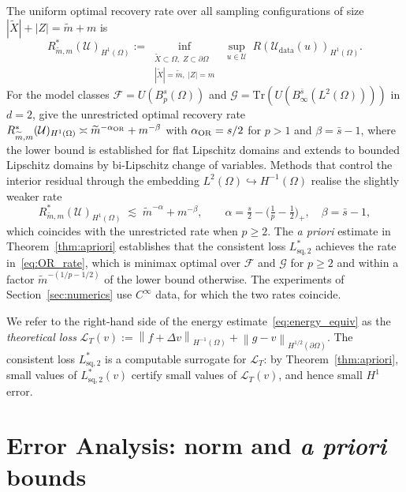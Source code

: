 \documentclass[11pt]{article}
\newcommand{\Omg}{\Omega}
\newcommand{\bOmg}{\partial\Omega}
\newcommand{\norm}[1]{\left\|#1\right\|}
\newcommand{\mtil}{\widetilde{m}}
\begin{document}
The uniform optimal recovery rate over all sampling
configurations of size $|\tilde{X}| + |Z| = \mtil + m$ is
\[
  R^*_{\mtil,m}(\mathcal{U})_{H^1(\Omg)}
  := \inf_{\substack{\tilde{X}\subset\Omg,\;
     Z\subset\bOmg \\ |\tilde{X}|=\mtil,\;|Z|=m}}
     \;\sup_{u\in\mathcal{U}}\;
     R(\mathcal{U}_{\mathrm{data}}(u))_{H^1(\Omg)}.
\]
For the model classes $\mathcal{F}=U(B^s_p(\Omg))$ and
$\mathcal{G}=\mathrm{Tr}(U(B^{\bar{s}}_\infty(L^2(\Omg))))$ in $d=2$,
\cite[Theorems~3.1 and~3.2]{bonito2025} give the unrestricted
optimal recovery rate
$R^*_{\mtil,m}(\mathcal{U})_{H^1(\Omg)}\asymp\mtil^{-\alpha_{\rm OR}}
+m^{-\beta}$ with $\alpha_{\rm OR}=s/2$ for $p>1$ and
$\beta=\bar{s}-1$, where the lower bound is established for flat
Lipschitz domains and extends to bounded Lipschitz domains by
bi-Lipschitz change of variables. Methods that control the interior
residual through the embedding $L^2(\Omg)\hookrightarrow
H^{-1}(\Omg)$ realise the slightly weaker rate
\begin{equation}\label{eq:OR_rate}
  R^*_{\mtil,m}(\mathcal{U})_{H^1(\Omg)}
  \;\lesssim\; \mtil^{-\alpha} + m^{-\beta},
  \qquad
  \alpha = \tfrac{s}{2}
    - \bigl(\tfrac{1}{p}-\tfrac{1}{2}\bigr)_+,
  \quad
  \beta = \bar{s} - 1,
\end{equation}
which coincides with the unrestricted rate when $p\ge 2$. The
\emph{a priori} estimate in Theorem~\ref{thm:apriori} establishes
that the consistent loss $L^*_{\mathrm{sq},2}$ achieves the rate
in~\eqref{eq:OR_rate}, which is minimax optimal over
$\mathcal{F}$ and $\mathcal{G}$ for $p\ge 2$ and within a factor
$\mtil^{-(1/p-1/2)}$ of the lower bound otherwise. The experiments
of Section~\ref{sec:numerics} use $C^\infty$ data, for which the
two rates coincide.
 
We refer to the right-hand side of the energy
estimate~\eqref{eq:energy_equiv} as the
\emph{theoretical loss}
$\mathcal{L}_T(v)
:= \norm{f+\Delta v}_{H^{-1}(\Omg)}
  + \norm{g - v}_{H^{1/2}(\bOmg)}$.
The consistent loss $L^*_{\mathrm{sq},2}$ is a computable
surrogate for $\mathcal{L}_T$: by
Theorem~\ref{thm:apriori}, small values of
$L^*_{\mathrm{sq},2}(v)$ certify small values of
$\mathcal{L}_T(v)$, and hence small $H^1$ error.



\section{Error Analysis: norm and \emph{a priori} bounds}\label{sec:theory}
\end{document}
